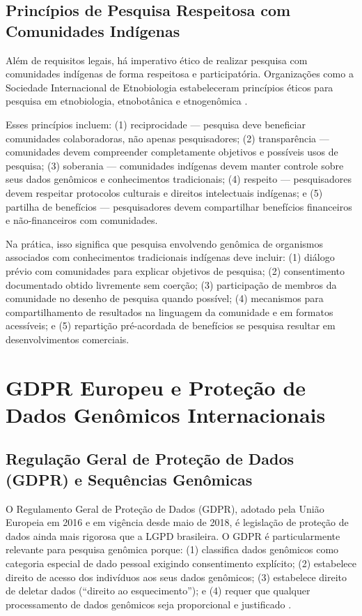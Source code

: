 \subsection{Princípios de Pesquisa Respeitosa com Comunidades Indígenas}

Além de requisitos legais, há imperativo ético de realizar pesquisa com comunidades indígenas de forma respeitosa e participatória. Organizações como a Sociedade Internacional de Etnobiologia estabeleceram princípios éticos para pesquisa em etnobiologia, etnobotânica e etnogenômica \parencite{ise2006}.

Esses princípios incluem: (1) reciprocidade --- pesquisa deve beneficiar comunidades colaboradoras, não apenas pesquisadores; (2) transparência --- comunidades devem compreender completamente objetivos e possíveis usos de pesquisa; (3) soberania --- comunidades indígenas devem manter controle sobre seus dados genômicos e conhecimentos tradicionais; (4) respeito --- pesquisadores devem respeitar protocolos culturais e direitos intelectuais indígenas; e (5) partilha de benefícios --- pesquisadores devem compartilhar benefícios financeiros e não-financeiros com comunidades.

Na prática, isso significa que pesquisa envolvendo genômica de organismos associados com conhecimentos tradicionais indígenas deve incluir: (1) diálogo prévio com comunidades para explicar objetivos de pesquisa; (2) consentimento documentado obtido livremente sem coerção; (3) participação de membros da comunidade no desenho de pesquisa quando possível; (4) mecanismos para compartilhamento de resultados na linguagem da comunidade e em formatos acessíveis; e (5) repartição pré-acordada de benefícios se pesquisa resultar em desenvolvimentos comerciais.

\section{GDPR Europeu e Proteção de Dados Genômicos Internacionais}

\subsection{Regulação Geral de Proteção de Dados (GDPR) e Sequências Genômicas}

O Regulamento Geral de Proteção de Dados (GDPR), adotado pela União Europeia em 2016 e em vigência desde maio de 2018, é legislação de proteção de dados ainda mais rigorosa que a LGPD brasileira. O GDPR é particularmente relevante para pesquisa genômica porque: (1) classifica dados genômicos como categoria especial de dado pessoal exigindo consentimento explícito; (2) estabelece direito de acesso dos indivíduos aos seus dados genômicos; (3) estabelece direito de deletar dados (``direito ao esquecimento''); e (4) requer que qualquer processamento de dados genômicos seja proporcional e justificado \parencite{gdpr2018}.

